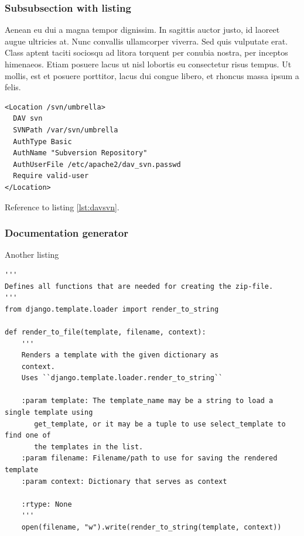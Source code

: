 \subsubsection{Subsubsection with listing}

Aenean eu dui a magna tempor dignissim. In sagittis auctor justo, id laoreet
augue ultricies at. Nunc convallis ullamcorper viverra. Sed quis vulputate
erat. Class aptent taciti sociosqu ad litora torquent per conubia nostra, per
inceptos himenaeos. Etiam posuere lacus ut nisl lobortis eu consectetur risus
tempus. Ut mollis, est et posuere porttitor, lacus dui congue libero, et
rhoncus massa ipsum a felis. 

\begin{lstlisting}[breaklines=true,frame=single,caption={WebDAV configuration in /etc/apache2/mods-available/dav\_svn.conf},label=lst:davsvn]
<Location /svn/umbrella>
  DAV svn
  SVNPath /var/svn/umbrella
  AuthType Basic
  AuthName "Subversion Repository"
  AuthUserFile /etc/apache2/dav_svn.passwd
  Require valid-user
</Location>
\end{lstlisting}

Reference to listing \ref{lst:davsvn}.



\subsubsection{Documentation generator}
\label{sec:documentation_generator}

Another listing

\lstset{tabsize=2,language=python}
\begin{lstlisting}[breaklines=true,frame=single,caption={Python file with doc-strings},label=lst:doc-string]
'''
Defines all functions that are needed for creating the zip-file.
'''
from django.template.loader import render_to_string

def render_to_file(template, filename, context):
    '''
    Renders a template with the given dictionary as
    context.
    Uses ``django.template.loader.render_to_string``

    :param template: The template_name may be a string to load a single template using
       get_template, or it may be a tuple to use select_template to find one of
       the templates in the list.       
    :param filename: Filename/path to use for saving the rendered template       
    :param context: Dictionary that serves as context

    :rtype: None
    '''
    open(filename, "w").write(render_to_string(template, context))
\end{lstlisting}


